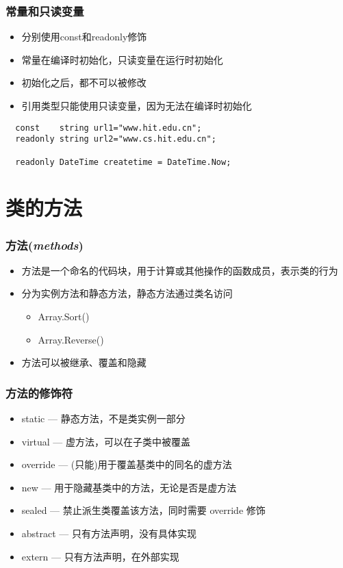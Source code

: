 \begin{frame}[fragile]
\frametitle{常量和只读变量}
\begin{itemize}
\setlength{\itemsep}{8pt plus 1pt}
\item 分别使用const和readonly修饰
\item 常量在编译时初始化，只读变量在运行时初始化
\item 初始化之后，都不可以被修改
\item 引用类型只能使用只读变量，因为无法在编译时初始化
\end{itemize}
\begin{lstlisting}
  const    string url1="www.hit.edu.cn";
  readonly string url2="www.cs.hit.edu.cn";

  readonly DateTime createtime = DateTime.Now;
\end{lstlisting}
\end{frame}

\section{类的方法}
\begin{frame}
\frametitle{方法(\textit{methods})}
\begin{itemize}
\setlength{\itemsep}{8pt plus 1pt}
\item 方法是一个命名的代码块，用于计算或其他操作的函数成员，表示类的行为
\item 分为实例方法和静态方法，静态方法通过类名访问
  \begin{itemize}
  \item Array.Sort()
  \item Array.Reverse()
  \end{itemize}
\item 方法可以被继承、覆盖和隐藏
\end{itemize}
\end{frame}

\begin{frame}
\frametitle{方法的修饰符}
\begin{itemize}
    \setlength{\itemsep}{6pt plus 1pt}
\item static --- 静态方法，不是类实例一部分
\item virtual --- 虚方法，可以在子类中被覆盖
\item override --- (只能)用于覆盖基类中的同名的虚方法
\item new --- 用于隐藏基类中的方法，无论是否是虚方法
\item sealed --- 禁止派生类覆盖该方法，同时需要 override 修饰
\item abstract --- 只有方法声明，没有具体实现
\item extern --- 只有方法声明，在外部实现
\end{itemize}
\end{frame}


